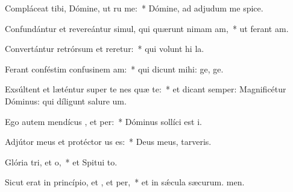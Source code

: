 \item Compláceat tibi, Dómine, ut ru me:~* Dómine, ad adjudum me spice.
\item Confundántur et revereántur simul, qui quærunt nimam am,~* ut ferant am.
\item Convertántur retrórsum et reretur:~* qui volunt hi la.
\item Ferant conféstim confusinem am:~* qui dicunt mihi: ge, ge.
\item Exsúltent et læténtur super te nes quæ te:~* et dicant semper: Magnificétur Dóminus: qui díligunt salure um.
\item Ego autem mendícus , et per:~* Dóminus sollíci est i.
\item Adjútor meus et protéctor us  es:~* Deus meus,  tarveris.
\item Glória tri, et o,~* et Spitui to.
\item Sicut erat in princípio, et , et per,~* et in sǽcula sæcurum. men.
